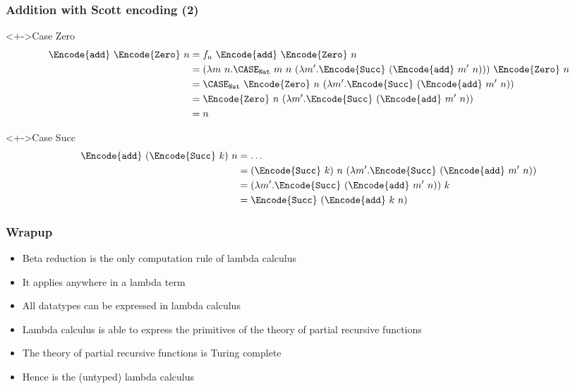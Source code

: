 \documentclass[pdftex,aspectratio=169]{beamer}
\begin{document}
\begin{frame}
  \frametitle{Addition with Scott encoding (2)}
\begin{block}<+->{Case Zero}
    \vspace{-\baselineskip}
    \begin{align*}
      \Encode{\mathtt{add}}\ \Encode{\mathtt{Zero}}\ n
      &= f_a\ \Encode{\mathtt{add}} \ \Encode{\mathtt{Zero}}\ n \\
      &= (\lambda m\ n. \CASE_{\mathtt{Nat}}\ m\ n\
        (\lambda m'. \Encode{\mathtt{Succ}}\ (\Encode{\mathtt{add}}\
        m'\ n)))\ \Encode{\mathtt{Zero}}\ n \\
      &= \CASE_{\mathtt{Nat}}\ \Encode{\mathtt{Zero}}\ n\
        (\lambda m'. \Encode{\mathtt{Succ}}\ (\Encode{\mathtt{add}}\
        m'\ n)) \\
      &= \Encode{\mathtt{Zero}}\ n\
        (\lambda m'. \Encode{\mathtt{Succ}}\ (\Encode{\mathtt{add}}\
        m'\ n)) \\
      &= n
    \end{align*}
  \end{block}
  \begin{block}<+->{Case Succ}
    \vspace{-\baselineskip}
    \begin{align*}
      \Encode{\mathtt{add}}\ (\Encode{\mathtt{Succ}}\ k)\ n
      &= \dots \\
      &= (\Encode{\mathtt{Succ}}\ k)\ n\
        (\lambda m'. \Encode{\mathtt{Succ}}\ (\Encode{\mathtt{add}}\
        m'\ n)) \\
      &=(\lambda m'. \Encode{\mathtt{Succ}}\ (\Encode{\mathtt{add}}\
        m'\ n))\ k  \\
      &= \Encode{\mathtt{Succ}}\ (\Encode{\mathtt{add}}\ k\ n)
    \end{align*}
  \end{block}
\end{frame}
\begin{frame}
  \frametitle{Wrapup}
  \begin{itemize}
  \item Beta reduction is the only computation rule of lambda calculus
  \item It applies anywhere in a lambda term
  \item All datatypes can be expressed in lambda calculus
  \item Lambda calculus is able to express the primitives of the
    theory of partial recursive functions
  \item The theory of partial recursive functions is Turing complete
  \item Hence is the (untyped) lambda calculus
  \end{itemize}
\end{frame}
\end{document}
